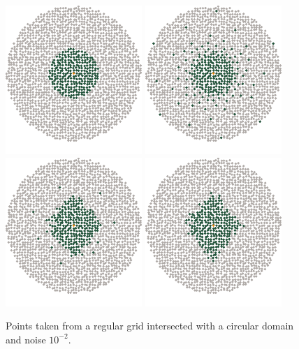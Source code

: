 \documentclass[review,supplement,onefignum,onetabnum]{siamonline220329}
\begin{document}
\begin{figure}[H]
  \centering
  \includegraphics{figures/precompiled/sphere_1e-2/points_1.pdf}%
  \quad
  \includegraphics{figures/precompiled/sphere_1e-2/points_2.pdf}%
  \quad
  \includegraphics{figures/precompiled/sphere_1e-2/points_3.pdf}%
  \quad
  \includegraphics{figures/precompiled/sphere_1e-2/points_4.pdf}%
  \caption{
    Points taken from a regular grid intersected
    with a circular domain and noise \( 10^{-2} \).
  }
\end{figure}
\end{document}
